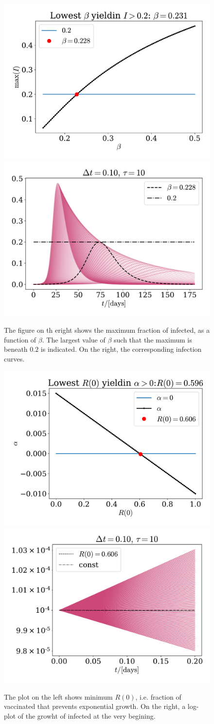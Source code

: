 \documentclass{article}
\begin{document}
    \begin{figure}[H]
        \centering
        \includegraphics[width=.49\textwidth]{../plots/2A/flatten.pdf}
        \includegraphics[width=.49\textwidth]{../plots/2A/flattenIs.pdf}
        \caption{The figure on th eright shows the maximum fraction of infected, as a function of $\beta$. 
        The largest value of $\beta$ such that the maximum is beneath $0.2$ is indicated. 
        On the right, the corresponding infection curves.}
        \label{flattening}
    \end{figure}

    \begin{figure}[H]
        \centering
        \includegraphics[width=.49\textwidth]{../plots/2A/vax.pdf}
        \includegraphics[width=.49\textwidth]{../plots/2A/vax_R.pdf}
        \caption{The plot on the left shows minimum $R(0)$, i.e. fraction of vaccinated that prevents exponential growth.
        On the right, a log-plot of the growht of infected at the very begining.}
        \label{vax}
    \end{figure}
\end{document}
